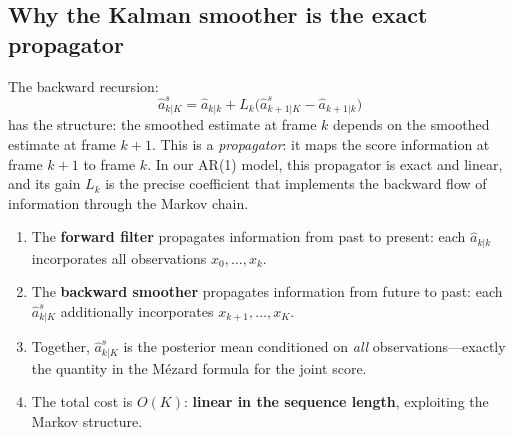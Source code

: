 \documentclass[11pt,a4paper]{article}
\begin{document}
\subsection{Why the Kalman smoother is the exact propagator}

The backward recursion:
\begin{equation}
  \hat{a}^s_{k|K} = \hat{a}_{k|k} + L_k\bigl(\hat{a}^s_{k+1|K} - \hat{a}_{k+1|k}\bigr)
\end{equation}
has the structure: the smoothed estimate at frame $k$ depends on the smoothed estimate at frame $k+1$.  This is a \emph{propagator}: it maps the score information at frame $k+1$ to frame $k$.  In our AR(1) model, this propagator is exact and linear, and its gain $L_k$ is the precise coefficient that implements the backward flow of information through the Markov chain.

\begin{keybox}
\begin{enumerate}[nosep]
  \item The \textbf{forward filter} propagates information from past to present: each $\hat{a}_{k|k}$ incorporates all observations $x_0, \dots, x_k$.
  \item The \textbf{backward smoother} propagates information from future to past: each $\hat{a}^s_{k|K}$ additionally incorporates $x_{k+1}, \dots, x_K$.
  \item Together, $\hat{a}^s_{k|K}$ is the posterior mean conditioned on \emph{all} observations---exactly the quantity in the M\'ezard formula for the joint score.
  \item The total cost is $O(K)$: \textbf{linear in the sequence length}, exploiting the Markov structure.
\end{enumerate}
\end{keybox}
\end{document}
